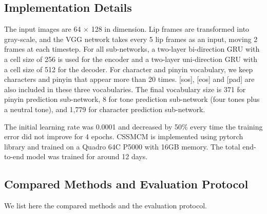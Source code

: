\documentclass[sigconf]{acmart}
\begin{document}
\subsection{Implementation Details}
The input images are 64 $\times$ 128 in dimension. Lip frames are transformed into gray-scale, and the VGG network takes every 5 lip frames as an input, moving 2 frames at each timestep. For all sub-networks, a two-layer bi-direction GRU \cite{cho2014learning} with a cell size of 256 is used for the encoder and a two-layer uni-direction GRU with a cell size of 512 for the decoder. For character and pinyin vocabulary, we keep characters and pinyin that appear more than 20 times. [sos], [eos] and [pad] are also included in these three vocabularies.  The final vocabulary size is 371 for pinyin prediction sub-network, 8 for tone prediction sub-network (four tones plus a neutral tone), and 1,779 for character prediction sub-network.

The initial learning rate was 0.0001 and decreased by 50\% every time the training error did not improve for 4 epochs. CSSMCM is implemented using pytorch library and trained on a Quadro 64C P5000 with 16GB memory. The total end-to-end model was trained for around 12 days.

\subsection{Compared Methods and Evaluation Protocol}
We list here the compared methods and the evaluation protocol.
\end{document}
